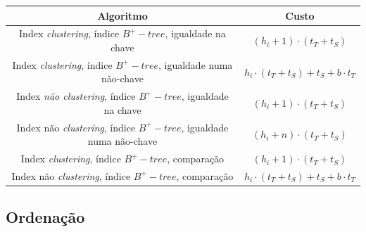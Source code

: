 \documentclass[oneside]{book}
\theoremstyle{definition}
\begin{document}
\begin{table}[H]
    \centering
    \begin{tabular}{c|c}
       Algoritmo                              & Custo  \\ \hline
      Index \textit{clustering}, índice $B^{+}-tree$, igualdade na chave                        &  $(h_i + 1) \cdot (t_T + t_S)$     \\ \hline
      Index \textit{clustering}, índice $B^{+}-tree$, igualdade numa não-chave                        &  $h_i \cdot (t_T + t_S) + t_S + b \cdot t_T$  \\ \hline
      Index \textit{não clustering}, índice $B^{+}-tree$, igualdade na chave                        &  $(h_i + 1) \cdot (t_T + t_S)$     \\ \hline
      Index não \textit{clustering}, índice $B^{+}-tree$, igualdade numa não-chave                        &   $(h_i + n) \cdot (t_T + t_S)$  \\ \hline
      Index \textit{clustering}, índice $B^{+}-tree$, comparação                        &  $(h_i + 1) \cdot (t_T + t_S)$     \\ \hline
      Index não \textit{clustering}, índice $B^{+}-tree$, comparação                        &    $h_i \cdot (t_T + t_S) + t_S + b \cdot t_T$  \\ \hline
    \end{tabular}
\end{table}

\subsection{Ordenação}
\end{document}
